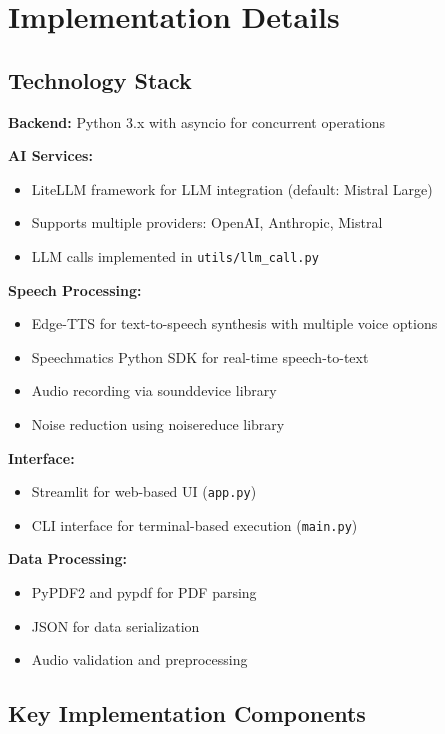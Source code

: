 \documentclass[conference]{IEEEtran}
\begin{document}
\section{Implementation Details}

\subsection{Technology Stack}

\textbf{Backend:} Python 3.x with asyncio for concurrent operations

\textbf{AI Services:}
\begin{itemize}
\item LiteLLM framework for LLM integration (default: Mistral Large)
\item Supports multiple providers: OpenAI, Anthropic, Mistral
\item LLM calls implemented in \texttt{utils/llm\_call.py}
\end{itemize}

\textbf{Speech Processing:}
\begin{itemize}
\item Edge-TTS for text-to-speech synthesis with multiple voice options
\item Speechmatics Python SDK for real-time speech-to-text
\item Audio recording via sounddevice library
\item Noise reduction using noisereduce library
\end{itemize}

\textbf{Interface:}
\begin{itemize}
\item Streamlit for web-based UI (\texttt{app.py})
\item CLI interface for terminal-based execution (\texttt{main.py})
\end{itemize}

\textbf{Data Processing:}
\begin{itemize}
\item PyPDF2 and pypdf for PDF parsing
\item JSON for data serialization
\item Audio validation and preprocessing
\end{itemize}

\subsection{Key Implementation Components}
\end{document}
